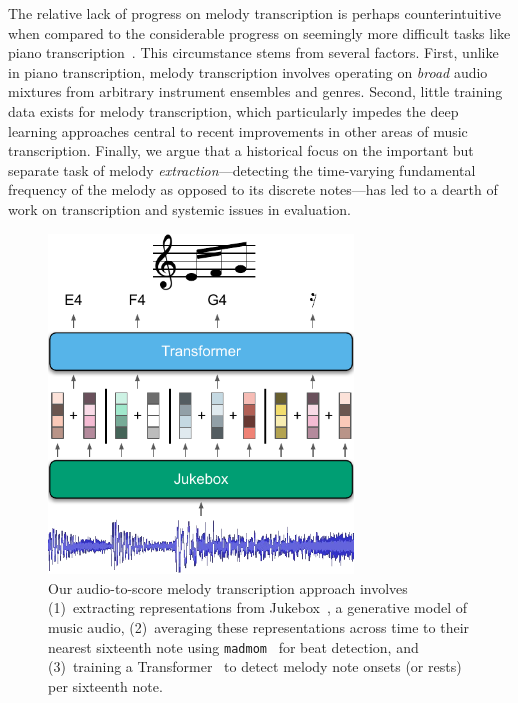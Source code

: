 \documentclass{article}
\newcommand{\madmom}{\texttt{madmom}}
\begin{document}
The relative lack of progress on melody transcription is perhaps counterintuitive when compared to the considerable progress on seemingly more difficult tasks like piano transcription~\cite{sigtia2016end,hawthorne2017onsets}.
This circumstance stems from several factors. 
First, unlike in piano transcription, melody transcription involves operating on \emph{broad} audio mixtures from arbitrary instrument ensembles and genres. 
Second, little training data exists for melody transcription, which particularly impedes the deep learning approaches central to recent improvements in other areas of music transcription.
Finally, we argue that a historical focus on the important but separate task of melody \emph{extraction}---detecting the time-varying fundamental frequency of the melody as opposed to its discrete notes---has led to a dearth of work on transcription and systemic issues in evaluation.

\begin{figure}
    \centering
    \includegraphics[width=8.1cm]{figs/fig1.pdf}
    \caption{
Our audio-to-score melody transcription approach involves 
(1)~extracting representations from Jukebox~\cite{dhariwal2020jukebox}, a generative model of music audio, 
(2)~averaging these representations across time to their nearest sixteenth note using \madmom~\cite{bock2016madmom,bock2016joint} for beat detection,
and
(3)~training a Transformer~\cite{vaswani2017attention} to detect melody note onsets (or rests) per sixteenth note.
}
 \label{fig:fig1}
\end{figure}
\end{document}
